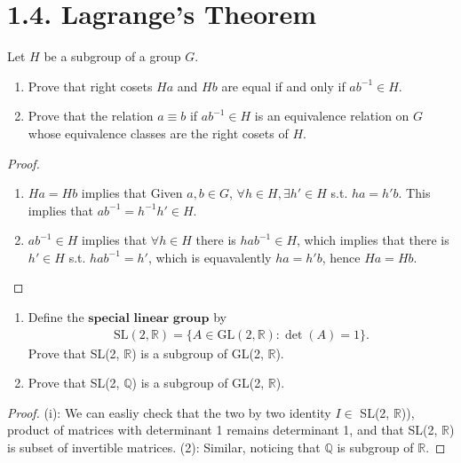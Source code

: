 \documentclass[15pt]{article}
\newenvironment{exercise}[2][Exercise]{\begin{trivlist}
\item[\hskip \labelsep {\bfseries #1}\hskip \labelsep {\bfseries #2.}]}
{\end{trivlist}}
\begin{document}
\section*{1.4.  Lagrange's Theorem}

\begin{exercise}{1.38}
    Let $H$ be a subgroup of a group $G$.
    \begin{enumerate}
        \item[(i)] Prove that right cosets $Ha$ and $Hb$ are equal if and only if $ab^{-1} \in H$.
        \item[(ii)] Prove that the relation $a \equiv b$ if $ab^{-1} \in H$ is an equivalence relation 
        on $G$ whose equivalence classes are the right cosets of $H$.
    \end{enumerate}
\end{exercise}

\begin{proof}
    \begin{enumerate}
        \item[$\implies$:] $Ha = Hb$ implies that Given $a,b\in G$,  $\forall h\in H, \exists h'\in H$  s.t. $ha=h'b$. This implies that
        $ab^{-1} = h^{-1}h' \in H$.
        \item[$\impliedby$:] $ab^{-1} \in H$ implies that  $\forall h\in H$ there is  $hab^{-1} \in H$, which implies that there is $h'\in H$ 
        s.t. $hab^{-1} = h'$, which is equavalently $ha = h'b$, hence $Ha=Hb$.
    \end{enumerate}

\end{proof}




\begin{exercise}{1.39}
    \begin{enumerate}
        \item[(i)] Define the $\textbf{special linear group}$ by
        \begin{align*}
            \text{SL}(2, \mathbb{R}) = \{A \in \text{GL} (2, \mathbb{R}): \det(A)=1\}.
        \end{align*}
        Prove that SL(2, $\mathbb{R}$) is a subgroup of GL(2, $\mathbb{R}$).
        \item[(i)] Prove that SL(2, $\mathbb{Q}$) is a subgroup of GL(2, $\mathbb{R}$).
    \end{enumerate}

\end{exercise}

\begin{proof}
    (i): We can easliy check that the two by two identity $I\in$ SL(2, $\mathbb{R}$)), 
    product of matrices with determinant 1 remains determinant 1,
    and that SL(2, $\mathbb{R}$) is subset of invertible matrices.
    (2): Similar, noticing that $\mathbb Q$ is subgroup of $\mathbb R$.
\end{proof}
\end{document}
